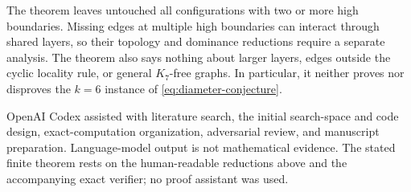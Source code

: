 \documentclass[11pt]{article}
\theoremstyle{remark}
\begin{document}
The theorem leaves untouched all configurations with two or more high
boundaries.  Missing edges at multiple high boundaries can interact through
shared layers, so their topology and dominance reductions require a separate
analysis.  The theorem also says nothing about larger layers, edges outside
the cyclic locality rule, or general $K_7$-free graphs.  In particular, it
neither proves nor disproves the $k=6$ instance of
\eqref{eq:diameter-conjecture}.

OpenAI Codex assisted with literature search, the initial search-space and
code design, exact-computation organization, adversarial review, and
manuscript preparation.  Language-model output is not mathematical evidence.
The stated finite theorem rests on the human-readable reductions above and
the accompanying exact verifier; no proof assistant was used.

\small


\end{document}
